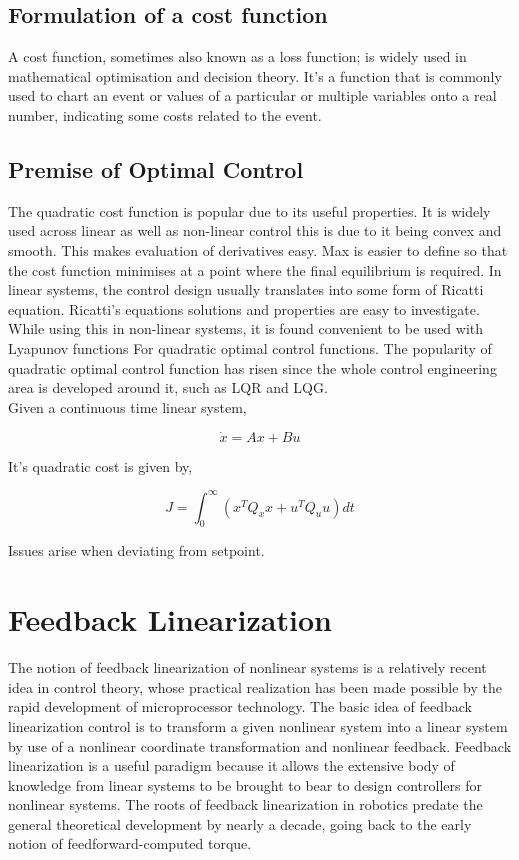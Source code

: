 \documentclass{UoNMCHA}
\numberwithin{equation}{section}
\begin{document}
	
	\subsection*{Formulation of a cost function }
	
	A cost function, sometimes also known as a loss function; is widely used in mathematical optimisation and decision theory. It's a function that is commonly used to chart an event or values of a particular or multiple variables onto a real number, indicating some costs related to the event.
	
	\subsection*{Premise of Optimal Control}
	
	The quadratic cost function is popular due to its useful properties. It is widely used across linear as well as non-linear control this is due to it being convex and smooth. This makes evaluation of derivatives easy. Max is easier to define so that the cost function minimises at a point where the final equilibrium is required. In linear systems, the control design usually translates into some form of Ricatti equation. Ricatti's equations solutions and properties are easy to investigate. While using this in non-linear systems, it is found convenient to be used with Lyapunov functions For quadratic optimal control functions. The popularity of quadratic optimal control function has risen since the whole control engineering area is developed around it, such as LQR and LQG.\\
	
	Given a continuous time linear system,
	
	\begin{equation}
	\dot{x} = Ax + Bu
	\end{equation}
	
	It's quadratic cost is given by,
	
	\begin{equation}
	J=\int_{0}^{\infty}(x^T Q_x x+u^T Q_u u)d t
	\end{equation}
	
	Issues arise when deviating from setpoint.
	
	\section{Feedback Linearization}
	
	The notion of feedback linearization of nonlinear systems is a relatively recent idea in control theory, whose practical realization has been made possible by the rapid development of microprocessor technology. The basic idea of feedback linearization control is to transform a given nonlinear system into a linear system by use of a nonlinear coordinate transformation and nonlinear   feedback. Feedback linearization is a useful paradigm because it allows the extensive body of knowledge from linear systems to be brought to bear to design controllers for nonlinear systems. The roots of feedback linearization in robotics predate the general theoretical development by nearly a decade, going back to the early notion of feedforward-computed torque. \\
	
\end{document}

